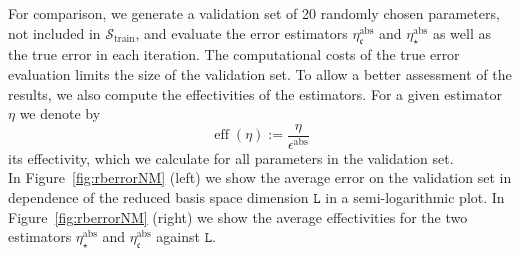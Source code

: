 \documentclass{article}
\theoremstyle{plain}
\theoremstyle{definition}
\theoremstyle{remark}
\DeclareMathOperator{\eff}{eff}
\newcommand{\RBestFineABS}{\eta_\star^\text{abs}}
\newcommand{\RBestCcABS}{\eta_\mathfrak{c}^\text{abs}}
\begin{document}
For comparison, we generate a validation set of 20 randomly chosen parameters, not included in $\mathcal{S}_{\text{train}}$, and evaluate the error estimators $\RBestCcABS$ and $\RBestFineABS$ as well as the true error in each iteration. The computational costs of the true error evaluation limits the size of the validation set. To allow a better assessment of the results, we also compute the effectivities of the estimators. For a given estimator $\eta$ we denote by
\begin{equation}
    \eff (\eta):= \frac{\eta}{\epsilon^\text{abs}}
\end{equation}
its effectivity, which we calculate for all parameters in the validation set. \\


In Figure~\ref{fig:rberrorNM} (left) we show the average error on the validation set in dependence of the reduced basis space dimension $\texttt{L}$ in a semi-logarithmic plot. In Figure~\ref{fig:rberrorNM} (right) we show the average effectivities for the two estimators $\RBestFineABS$ and $\RBestCcABS$ against $\texttt{L}$.
\end{document}
